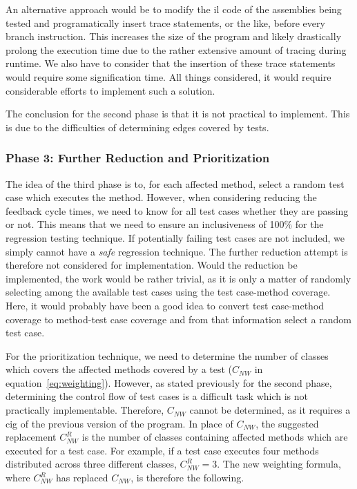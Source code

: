 \documentclass[a4paper,english,12pt]{report}
\begin{document}
An alternative approach would be to modify the \gls{il} code of the assemblies being tested and programatically insert trace statements, or the like, before every branch instruction. This increases the size of the program and likely drastically prolong the execution time due to the rather extensive amount of tracing during runtime. We also have to consider that the insertion of these trace statements would require some signification time. All things considered, it would require considerable efforts to implement such a solution.

The conclusion for the second phase is that it is not practical to implement. This is due to the difficulties of determining edges covered by tests.

\subsubsection{Phase 3: Further Reduction and Prioritization}
The idea of the third phase is to, for each affected method, select a random test case which executes the method. However, when considering reducing the feedback cycle times, we need to know for all test cases whether they are passing or not. This means that we need to ensure an inclusiveness of 100\% for the regression testing technique. If potentially failing test cases are not included, we simply cannot have a \textit{safe} regression technique. The further reduction attempt is therefore not considered for implementation. Would the reduction be implemented, the work would be rather trivial, as it is only a matter of randomly selecting among the available test cases using the test case-method coverage. Here, it would probably have been a good idea to convert test case-method coverage to  method-test case coverage and from that information select a random test case.

For the prioritization technique, we need to determine the number of classes which covers the affected methods covered by a test ($C_{\mathit{NW}}$ in equation~\vref{eq:weighting}). However, as stated previously for the second phase, determining the control flow of test cases is a difficult task which is not practically implementable. Therefore, $C_{\mathit{NW}}$ cannot be determined, as it requires a \gls{cig} of the previous version of the program. In place of $C_{\mathit{NW}}$, the suggested replacement $C_{\mathit{NW}}^{R}$ is the number of classes containing affected methods which are executed for a test case. For example, if a test case executes four methods distributed across three different classes, $C_{\mathit{NW}}^{R}=3$. The new weighting formula, where $C_{\mathit{NW}}^{R}$ has replaced $C_{\mathit{NW}}$, is therefore the following.
\end{document}
